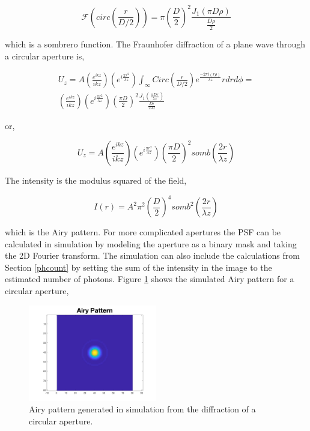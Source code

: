 \begin{equation}
    \mathcal{F}\left(circ\left(\frac{r}{D/2}\right)\right)=\pi{\left(\frac{D}{2}\right)}^2 \frac{J_1(\pi D \rho)}{\frac{D\rho}{2}}
\end{equation}

which is a sombrero function. The Fraunhofer diffraction of a plane wave through a circular aperture is, 


\begin{eqnarray}
   U_z=A\left(\frac{e^{ikz}}{ikz}\right)\left(e^{i\frac{\pi r^2}{\lambda z}}\right)\int_{\infty} Circ\left(\frac{r}{D/2}\right)e^{\frac{-2\pi i (r \rho )}{\lambda z}}rdrd\phi= \\
   \left(\frac{e^{ikz}}{ikz}\right)\left(e^{i\frac{\pi r^2}{\lambda z}}\right) {\left(\frac{\pi D}{2}\right)}^2 \frac{J_1 (\frac{\pi Dr}{\lambda z})}{\frac{Dr}{2\lambda z}} \nonumber
\end{eqnarray}

or,

\begin{equation}
    U_z=A \left(\frac{e^{ikz}}{ikz}\right)\left(e^{i\frac{\pi r^2}{\lambda z}}\right) {\left(\frac{\pi D}{2}\right)}^2 somb\left(\frac{2r}{\lambda z}\right)
\end{equation} 

The intensity is the modulus squared of the field,

\begin{equation}
    I(r)=A^2 {\pi^2\left(\frac{D}{2}\right)}^4 somb^2\left(\frac{2r}{\lambda z}\right)
\end{equation}

which is the Airy pattern. For more complicated apertures the PSF can be calculated in simulation by modeling the aperture as a binary mask and taking the 2D Fourier transform. The simulation can also include the calculations from Section \ref{phcount} by setting the sum of the intensity in the image to the estimated number of photons. Figure \ref{fig:Airy} shows the simulated Airy pattern for a circular aperture,

\begin{figure}
    \centering
    \includegraphics[width=0.5\textwidth]{Chapter Materials/Chapter One Materials/AiryPattern.jpg}
    \caption{Airy pattern generated in simulation from the diffraction of a circular aperture.}
    \label{fig:Airy}
\end{figure}

